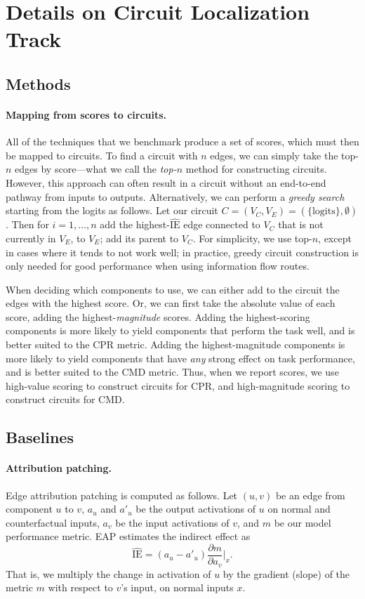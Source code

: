 \documentclass{article}
\theoremstyle{plain}
\theoremstyle{definition}
\theoremstyle{remark}
\begin{document}
\section{Details on Circuit Localization Track}\label{app:subgraph-methods}
\subsection{Methods}\label{app:circuit_methods}
\paragraph{Mapping from scores to circuits.} All of the techniques that we benchmark produce a set of scores, which must then be mapped to circuits. To find a circuit with $n$ edges, we can simply take the top-$n$ edges by score---what we call the \emph{top-$n$} method for constructing circuits. However, this approach can often result in a circuit without an end-to-end pathway from inputs to outputs. Alternatively, we can perform a \emph{greedy search} starting from the logits as follows. Let our circuit $C=(V_C, V_E)=(\{\text{logits}\}, \emptyset)$. Then for $i=1,\ldots,n$ add the highest-$\hat{\text{IE}}$ edge connected to $V_C$ that is not currently in $V_E$, to $V_E$; add its parent to $V_C$. For simplicity, we use top-$n$, except in cases where it tends to not work well; in practice, greedy circuit construction is only needed for good performance when using information flow routes.

When deciding which components to use, we can either add to the circuit the edges with the highest score. Or, we can first take the absolute value of each score, adding the highest-\emph{magnitude} scores. Adding the highest-scoring components is more likely to yield components that perform the task well, and is better suited to the \textsf{CPR} metric. Adding the highest-magnitude components is more likely to yield components that have \emph{any} strong effect on task performance, and is better suited to the \textsf{CMD} metric. Thus, when we report scores, we use high-value scoring to construct circuits for \textsf{CPR}, and high-magnitude scoring to construct circuits for \textsf{CMD}.

\subsection{Baselines}\label{app:circuit_baselines}
\paragraph{Attribution patching.}\label{app:eap}
Edge attribution patching is computed as follows. Let $(u,v)$ be an edge from component $u$ to $v$, $a_u$ and $a'_u$ be the output activations of $u$ on normal and counterfactual inputs, $a_v$ be the input activations of $v$, and $m$ be our model performance metric.
EAP estimates the indirect effect as 
\begin{equation}
    \hat{\text{IE}} = (a_u-a'_u)\frac{\partial m}{\partial a_v}\Big|_x.
\label{eq:eap}
\end{equation}
That is, we multiply the change in activation of $u$ by the gradient (slope) of the metric $m$ with respect to $v$'s input, on normal inputs $x$.
\end{document}
